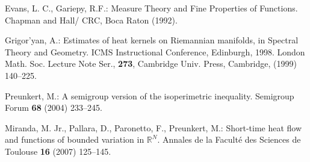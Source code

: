 \documentclass[a4paper,9pt]{amsart}
\begin{document}
\begin{thebibliography}{99}
Evans, L. C., Gariepy, R.F.:
Measure Theory and Fine Properties of Functions.
Chapman and Hall/ CRC, Boca Raton (1992).

 Grigor'yan, A.: Estimates of heat kernels
on Riemannian manifolds, in Spectral Theory and Geometry. ICMS
Instructional Conference, Edinburgh, 1998. London Math. Soc.
Lecture Note Ser., \textbf{273}, Cambridge Univ. Press, Cambridge,
(1999) 140--225.

Preunkert, M.: A semigroup version of the isoperimetric
inequality. Semigroup Forum \textbf{68} (2004) 233--245.

Miranda, M. Jr., Pallara, D., Paronetto, F., Preunkert, M.:
Short-time heat flow and functions of bounded variation in
$\mathbb{R}^{N}$. Annales de la Facult\'{e} des Sciences de
Toulouse \textbf{16} (2007) 125--145.

\end{thebibliography}
\end{document}
